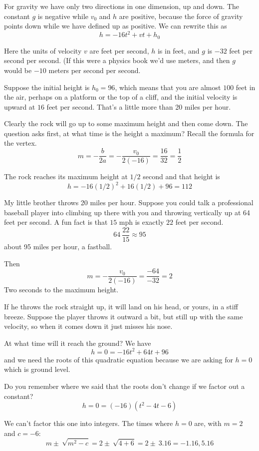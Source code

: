 \documentclass[11pt, oneside]{article}
\begin{document}
For gravity we have only two directions in one dimension, up and down.  The constant $g$ is negative while $v_0$ and $h$ are positive, because the force of gravity points down while we have defined up as positive.  We can rewrite this as
\[ h = -16t^2 + vt + h_0 \]

Here the units of velocity $v$ are feet per second, $h$ is in feet, and $g$ is $-32$ feet per second per second.  (If this were a physics book we'd use meters, and then $g$ would be $-10$ meters per second per second.

Suppose the initial height is $h_0 = 96$, which means that you are almost $100$ feet in the air, perhaps on a platform or the top of a cliff, and the initial velocity is upward at $16$ feet per second.  That's a little more than 20 miles per hour.

Clearly the rock will go up to some maximum height and then come down.  The question asks first, at what time is the height a maximum?  Recall the formula for the vertex.
\[ m = -\frac{b}{2a} = -\frac{v_0}{2(-16)} = \frac{16}{32} = \frac{1}{2} \]

The rock reaches its maximum height at $1/2$ second and that height is
\[ h = -16(1/2)^2 + 16(1/2) + 96 = 112 \]

My little brother throws 20 miles per hour.  Suppose you could talk a professional baseball player into climbing up there with you and throwing vertically up at 64 feet per second.  A fun fact is that $15$ mph is exactly $22$ feet per second.
\[ 64 \ \frac{22}{15} \approx 95 \]
about 95 miles per hour, a fastball.

Then
\[ m = - \frac{v_0}{2(-16)} = \frac{-64}{-32} = 2 \]
Two seconds to the maximum height.

If he throws the rock straight up, it will land on his head, or yours, in a stiff breeze.  Suppose the player throws it outward a bit, but still up with the same velocity, so when it comes down it just misses his nose.  

At what time will it reach the ground?  We have
\[ h = 0 = -16t^2 + 64t + 96 \]
and we need the roots of this quadratic equation because we are asking for $h = 0$ which is ground level.

Do you remember where we said that the roots don't change if we factor out a constant?
\[ h = 0 = (-16)(t^2 - 4t - 6) \]

We can't factor this one into integers.  The times where $h = 0$ are, with $m = 2$ and $c = -6$:
\[ m \pm \ \sqrt{m^2 - c} = 2 \pm \ \sqrt{4 + 6} = 2 \pm \ 3.16 = - 1.16, 5.16 \]
\end{document}
